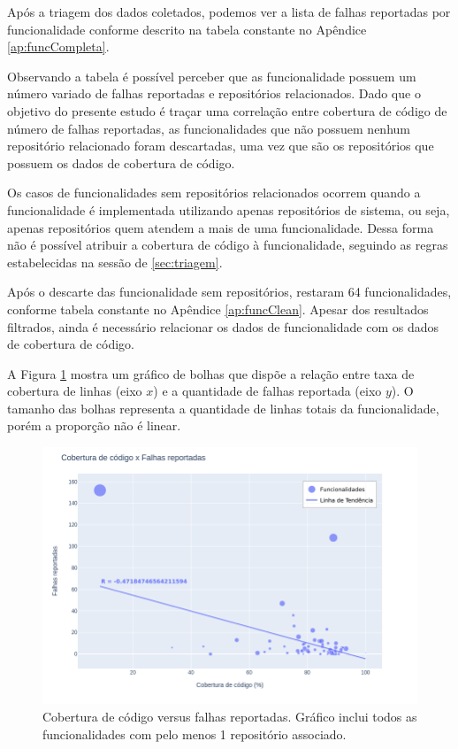 \documentclass[11.5pt]{article}
\begin{document}
Após a triagem dos dados coletados, podemos ver a lista de falhas reportadas por funcionalidade
conforme descrito na tabela constante no Apêndice \ref{ap:funcCompleta}.

Observando a tabela é possível perceber que as funcionalidade possuem um número variado de falhas
reportadas e repositórios relacionados.
Dado que o objetivo do presente estudo é traçar uma correlação entre cobertura de código de número
de falhas reportadas, as funcionalidades que não possuem nenhum repositório relacionado foram
descartadas, uma vez que são os repositórios que possuem os dados de cobertura de código.

Os casos de funcionalidades sem repositórios relacionados ocorrem quando a funcionalidade é
implementada utilizando apenas repositórios de sistema, ou seja, apenas repositórios quem atendem a
mais de uma funcionalidade.
Dessa forma não é possível atribuir a cobertura de código à funcionalidade, seguindo as regras
estabelecidas na sessão de \ref{sec:triagem}.

Após o descarte das funcionalidade sem repositórios, restaram 64 funcionalidades, conforme
tabela constante no Apêndice \ref{ap:funcClean}.
Apesar dos resultados filtrados, ainda é necessário relacionar os dados de funcionalidade com os
dados de cobertura de código.

A Figura \ref{fig:cc_bugs_geral} mostra um gráfico de bolhas que dispõe a relação entre taxa de
cobertura de linhas (eixo $x$) e a quantidade de falhas reportada (eixo $y$).
O tamanho das bolhas representa a quantidade de linhas totais da funcionalidade, porém a proporção
não é linear.

\begin{figure}[ht]
    \centering
    \includegraphics[width=1.0\textwidth]{cc_bugs_geral.png}
    \caption{Cobertura de código versus falhas reportadas. Gráfico inclui todos as funcionalidades
com pelo menos 1 repositório associado.}
    \label{fig:cc_bugs_geral}
\end{figure}
\end{document}
